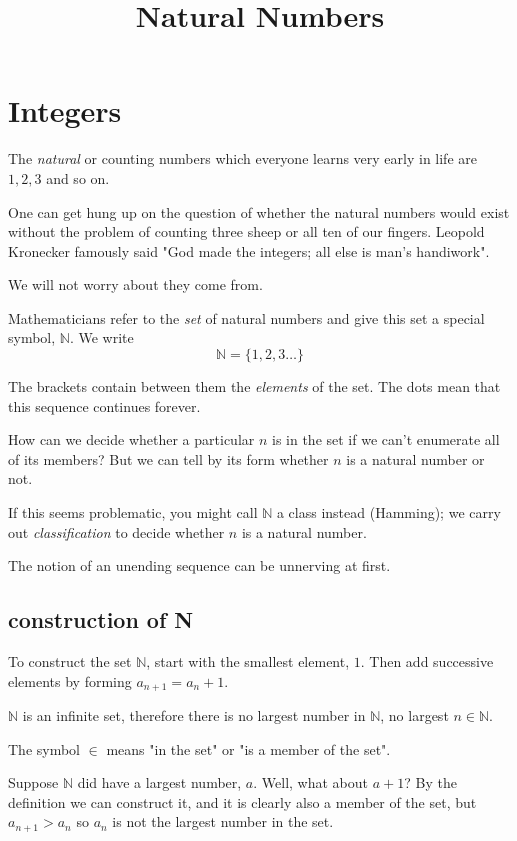 \documentclass[11pt, oneside]{article}
\title{Natural Numbers}
\date{}
\begin{document}
\maketitle
\Large
\section*{Integers}

The \emph{natural} or counting numbers which everyone learns very early in life are $1, 2, 3$ and so on.

One can get hung up on the question of whether the natural numbers would exist without the problem of counting three sheep or all ten of our fingers.  Leopold Kronecker famously said "God made the integers; all else is man's handiwork".

We will not worry about they come from.

Mathematicians refer to the \emph{set} of natural numbers and give this set a special symbol, $\mathbb{N}$.  We write
\[ \mathbb{N} = \{ 1, 2, 3 \dots \} \]

The brackets contain between them the \emph{elements} of the set. The dots mean that this sequence continues forever.

How can we decide whether a particular $n$ is in the set if we can't enumerate all of its members?  But we can tell by its form whether $n$ is a natural number or not.  

If this seems problematic, you might call $\mathbb{N}$ a class instead (Hamming);  we carry out \emph{classification} to decide whether $n$ is a natural number.

The notion of an unending sequence can be unnerving at first.

\subsection*{construction of N}

To construct the set $\mathbb{N}$, start with the smallest element, $1$.  Then add successive elements by forming $a_{n+1} = a_n + 1$.

$\mathbb{N}$ is an infinite set, therefore there is no largest number in $\mathbb{N}$, no largest $n \in \mathbb{N}$.

The symbol $\in$ means "in the set" or "is a member of the set".

Suppose $\mathbb{N}$ did have a largest number, $a$.  Well, what about $a + 1$?  By the definition we can construct it, and it is clearly also a member of the set, but $a_{n+1} > a_n$ so $a_n$ is not the largest number in the set.
\end{document}
